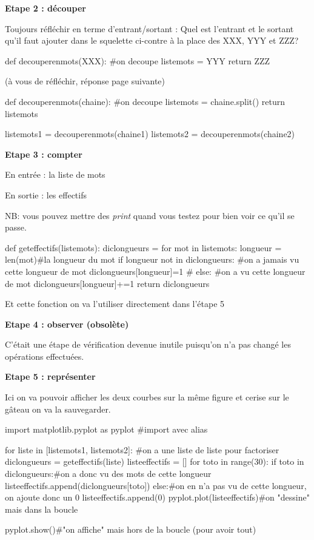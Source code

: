 \textbf{Etape 2 : découper}

Toujours réfléchir en terme d'entrant/sortant : Quel est l'entrant
et le sortant qu'il faut ajouter dans le squelette ci-contre à la
place des XXX, YYY et ZZZ?

\begin{python} def decouperenmots(XXX): \#on decoupe listemots =
YYY return ZZZ

\end{python}

(à vous de réfléchir, réponse page suivante) \newpage{}

\begin{python} def decouperenmots(chaine): \#on decoupe listemots
= chaine.split() return listemots

listemots1 = decouperenmots(chaine1) listemots2 = decouperenmots(chaine2)
\end{python}

\textbf{Etape 3 : compter}

En entrée : la liste de mots

En sortie : les effectifs

NB: vous pouvez mettre des \textit{print} quand vous testez pour bien
voir ce qu'il se passe.

\begin{python}

def geteffectifs(listemots): diclongueurs = {} for mot in listemots:
longueur = len(mot)\#la longueur du mot if longueur not in diclongueurs:
\#on a jamais vu cette longueur de mot diclongueurs{[}longueur{]}=1
\# else: \#on a vu cette longueur de mot diclongueurs{[}longueur{]}+=1
return diclongueurs

\end{python}

Et cette fonction on va l'utiliser directement dans l'étape 5

\textbf{Etape 4 : observer (obsolète)}

C'était une étape de vérification devenue inutile puisqu'on n'a pas
changé les opérations effectuées.

\textbf{Etape 5 : représenter}

Ici on va pouvoir afficher les deux courbes sur la même figure et
cerise sur le gâteau on va la sauvegarder.

\begin{python} import matplotlib.pyplot as pyplot \#import avec alias

for liste in {[}listemots1, listemots2{]}: \#on a une liste de liste
pour factoriser diclongueurs = geteffectifs(liste) listeeffectifs
= {[}{]} for toto in range(30): if toto in diclongueurs:\#on a donc
vu des mots de cette longueur listeeffectifs.append(diclongueurs{[}toto{]})
else:\#on en n'a pas vu de cette longueur, on ajoute donc un 0 listeeffectifs.append(0)
pyplot.plot(listeeffectifs)\#on "dessine" mais dans la boucle

pyplot.show()\#"on affiche" mais hors de la boucle (pour avoir tout)

\end{python}

